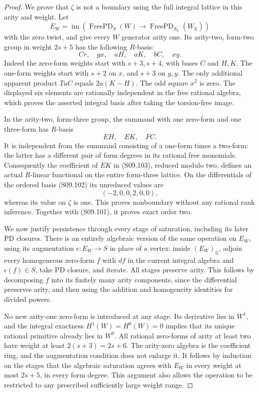\begin{proof}
We prove that $\zeta$ is not a boundary using the full
integral lattice in this arity and weight.  Let
\[
 E_W=\operatorname{im}\left(
 \operatorname{FreePD}_{S}(W)\longrightarrow
 \operatorname{FreePD}_{S_{\mathbb Q}}(W_{\mathbb Q})
 \right)
\]
with the zero twist, and give every $W$ generator arity
one.  Its arity-two, form-two group in weight $2s+5$
has the following $R$-basis:
\[
                  Cr,\quad gx,\quad aH,\quad aK,
                         \quad bC,\quad xy.         \tag{S09.102}
\]
Indeed the zero-form weights start with $s+3,s+4$,
with bases $C$ and $H,K$.  The one-form weights start
with $s+2$ on $x$, and $s+3$ on $g,y$.
The only additional apparent product $TaC$ equals
$2a(K-H)$.  The odd square $x^2$ is zero.  The
displayed six elements are rationally independent in
the free rational algebra, which proves the asserted
integral basis after taking the torsion-free image.

In the arity-two, form-three group, the summand with
one zero-form and one three-form has $R$-basis
\[
                            EH,\quad EK,\quad FC.
 \tag{S09.103}
\]
It is independent from the summand consisting of a
one-form times a two-form: the latter has a different
pair of form degrees in its rational free monomials.
Consequently the coefficient of $EK$ in (S09.103),
reduced modulo two, defines an actual $R$-linear
functional on the entire form-three lattice.
On the differentials of the ordered basis (S09.102)
its unreduced values are
\[
                         (-2,0,0,2,0,0),            \tag{S09.104}
\]
whereas its value on $\zeta$ is one.  This proves
nonboundary without any rational rank inference.
Together with (S09.101), it proves exact order two.

We now justify persistence through every stage of
saturation, including its later PD closures.  There
is an entirely algebraic version of the same operation
on $E_W$, using its augmentation
$\epsilon:E_W\to S$ in place of a vertex: inside
$(E_W)_{\mathbb Q}$, adjoin every homogeneous zero-form
$f$ with $df$ in the current integral algebra and
$\epsilon(f)\in S$, take PD closure, and iterate.
All stages preserve arity.  This follows by decomposing
$f$ into its finitely many arity components, since
the differential preserves arity, and then using the
addition and homogeneity identities for divided powers.

No new arity-one zero-form is introduced at any stage.
Its derivative lies in $W^1$, and the integral
exactness $H^1(W)=H^0(W)=0$ implies that its unique
rational primitive already lies in $W^0$.
All rational zero-forms of arity at least two have
weight at least $2(s+3)=2s+6$.  The arity-zero algebra
is the coefficient ring, and the augmentation condition
does not enlarge it.  It follows by induction on the
stages that the algebraic saturation agrees with $E_W$
in every weight at most $2s+5$, in every form degree.
This argument also allows the operation to be restricted
to any prescribed sufficiently large weight range.


\end{proof}
